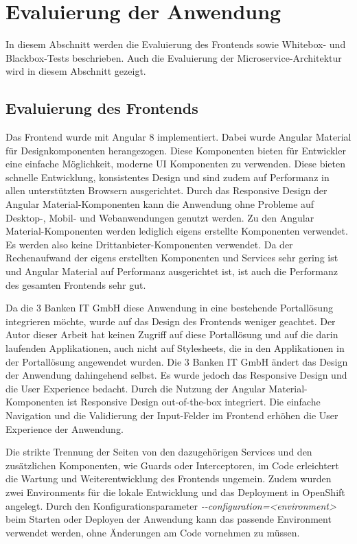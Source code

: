 \chapter{Evaluierung der Anwendung}
In diesem Abschnitt werden die Evaluierung des Frontends sowie Whitebox- und Blackbox-Tests beschrieben. Auch die Evaluierung der Microservice-Architektur wird in diesem Abschnitt gezeigt.

\section{Evaluierung des Frontends}
Das Frontend wurde mit Angular 8 implementiert. Dabei wurde Angular Material für Designkomponenten herangezogen. Diese Komponenten bieten für Entwickler eine einfache Möglichkeit, moderne UI Komponenten zu verwenden. Diese bieten schnelle Entwicklung, konsistentes Design und sind zudem auf Performanz in allen unterstützten Browsern ausgerichtet. Durch das Responsive Design der Angular Material-Komponenten kann die Anwendung ohne Probleme auf Desktop-, Mobil- und Webanwendungen genutzt werden. Zu den Angular Material-Komponenten werden lediglich eigens erstellte Komponenten verwendet. Es werden also keine Drittanbieter-Komponenten verwendet. Da der Rechenaufwand der eigens erstellten Komponenten und Services sehr gering ist und Angular Material auf Performanz ausgerichtet ist, ist auch die Performanz des gesamten Frontends sehr gut.

Da die 3 Banken IT GmbH diese Anwendung in eine bestehende Portallösung integrieren möchte, wurde auf das Design des Frontends weniger geachtet. Der Autor dieser Arbeit hat keinen Zugriff auf diese Portallösung und auf die darin laufenden Applikationen, auch nicht auf Stylesheets, die in den Applikationen in der Portallösung angewendet wurden. Die 3 Banken IT GmbH ändert das Design der Anwendung dahingehend selbst. Es wurde jedoch das Responsive Design und die User Experience bedacht. Durch die Nutzung der Angular Material-Komponenten ist Responsive Design out-of-the-box integriert. Die einfache Navigation und die Validierung der Input-Felder im Frontend erhöhen die User Experience der Anwendung.

Die strikte Trennung der Seiten von den dazugehörigen Services und den zusätzlichen Komponenten, wie Guards oder Interceptoren, im Code erleichtert die Wartung und Weiterentwicklung des Frontends ungemein. Zudem wurden zwei Environments für die lokale Entwicklung und das Deployment in OpenShift angelegt. Durch den Konfigurationsparameter \textit{-{}-configuration=<environment>} beim Starten oder Deployen der Anwendung kann das passende Environment verwendet werden, ohne Änderungen am Code vornehmen zu müssen.

